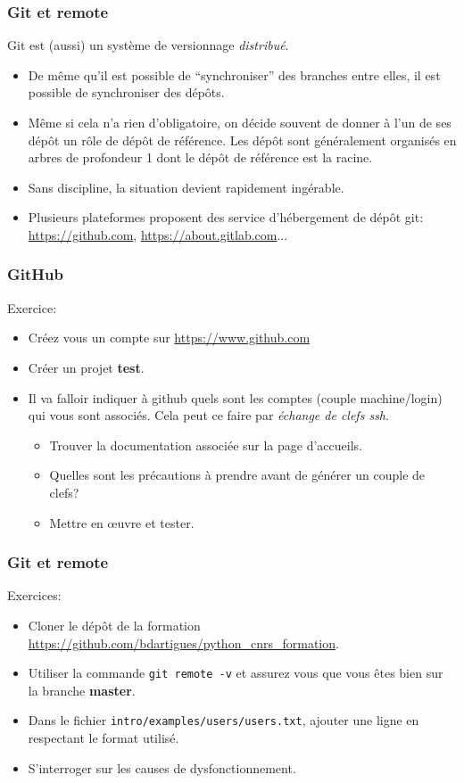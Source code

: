 \documentclass{beamer}
\begin{document}
\begin{frame}[fragile]\frametitle{Git et remote}
  Git est (aussi) un système de versionnage {\em distribué}.
  \begin{itemize}
    \item De même qu'il est possible de ``synchroniser'' des branches entre elles, il est possible de synchroniser des dépôts.
    \item Même si cela n'a rien d'obligatoire, on décide souvent de donner à l'un de ses dépôt un rôle de dépôt de référence. Les dépôt sont généralement organisés en arbres de profondeur 1 dont le dépôt de référence est la racine.
    \item Sans discipline, la situation devient rapidement ingérable.
    \item Plusieurs plateformes proposent des service d'hébergement de dépôt git: \url{https://github.com}, \url{https://about.gitlab.com}...
  \end{itemize}
\end{frame}

\begin{frame}[fragile]\frametitle{GitHub}
  
  Exercice:
  \begin{itemize}
  \item Créez vous un compte sur \url{https://www.github.com}
  \item Créer un projet {\bf test}.
  \item Il va falloir indiquer à github quels sont les comptes (couple machine/login) qui vous sont associés. Cela peut ce faire par {\em échange de clefs ssh}. 
    \begin{itemize}
    \item Trouver la documentation associée sur la page d'accueils.
    \item Quelles sont les précautions à prendre avant de générer un couple de clefs?
    \item Mettre en œuvre et tester.
    \end{itemize}
  \end{itemize}
\end{frame}

\begin{frame}[fragile]\frametitle{Git et remote}
  Exercices: 
  \begin{itemize}
  \item Cloner le dépôt de la formation \url{https://github.com/bdartigues/python_cnrs_formation}.
  \item Utiliser la commande {\tt git remote -v} et assurez vous que vous êtes bien sur la branche {\bf master}.
  \item Dans le fichier {\tt intro/examples/users/users.txt}, ajouter une ligne en respectant le format utilisé.
  \item S'interroger sur les causes de dysfonctionnement.
  \end{itemize}
\end{frame}
\end{document}
